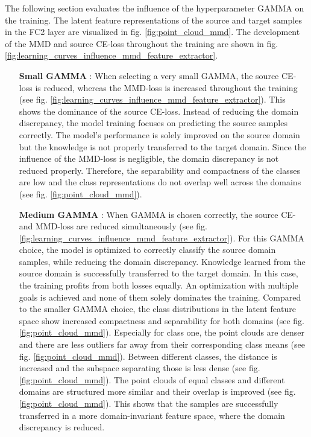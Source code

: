 The following section evaluates the influence of the hyperparameter GAMMA on the training. The latent feature representations of the source and target samples in the FC2 layer are visualized in fig. \ref{fig:point_cloud_mmd}. The development of the MMD and source CE-loss throughout the training are shown in fig. \ref{fig:learning_curves_influence_mmd_feature_extractor}.
\begin{itemize}
    \item [\textbf{Small GAMMA}]:
    When selecting a very small GAMMA, the source CE-loss is reduced, whereas the MMD-loss is increased throughout the training (see fig. \ref{fig:learning_curves_influence_mmd_feature_extractor}). This shows the dominance of the source CE-loss. Instead of reducing the domain discrepancy, the model training focuses on predicting the source samples correctly. The model's performance is solely improved on the source domain but the knowledge is not properly transferred to the target domain. Since the influence of the MMD-loss is negligible, the domain discrepancy is not reduced properly. Therefore, the separability and compactness of the classes are low and the class representations do not overlap well across the domains (see fig. \ref{fig:point_cloud_mmd}).
    \item [\textbf{Medium GAMMA}]:
    When GAMMA is chosen correctly, the source CE- and MMD-loss are reduced simultaneously (see fig. \ref{fig:learning_curves_influence_mmd_feature_extractor}). For this GAMMA choice, the model is optimized to correctly classify the source domain samples, while reducing the domain discrepancy. Knowledge learned from the source domain is successfully transferred to the target domain. In this case, the training profits from both losses equally. An optimization with multiple goals is achieved and none of them solely dominates the training. Compared to the smaller GAMMA choice, the class distributions in the latent feature space show increased compactness and separability for both domains (see fig. \ref{fig:point_cloud_mmd}). Especially for class one, the point clouds are denser and there are less outliers far away from their corresponding class means (see fig. \ref{fig:point_cloud_mmd}). Between different classes, the distance is increased and the subspace separating those is less dense (see fig. \ref{fig:point_cloud_mmd}). The point clouds of equal classes and different domains are structured more similar and their overlap is improved (see fig. \ref{fig:point_cloud_mmd}). This shows that the samples are successfully transferred in a more domain-invariant feature space, where the domain discrepancy is reduced.

\end{itemize}
